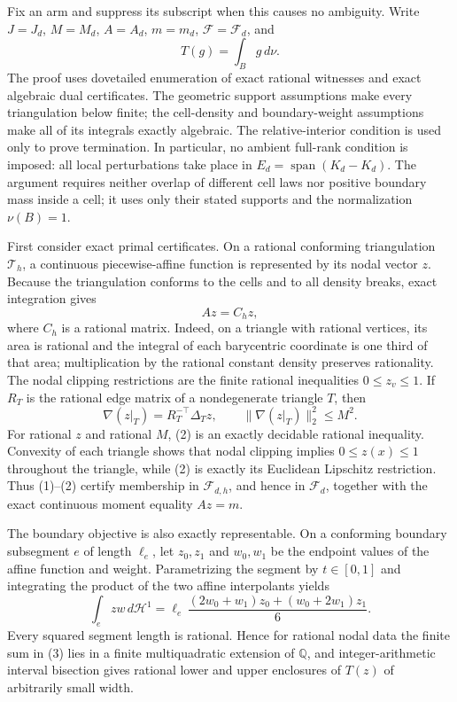 Fix an arm and suppress its subscript when this causes no ambiguity.  Write
\(J=J_d\), \(M=M_d\), \(A=A_d\), \(m=m_d\),
\(\mathcal F=\mathcal F_d\), and
\[
 T(g)=\int_B g\,d\nu.
\]
The proof uses dovetailed enumeration of exact rational witnesses and exact
algebraic dual certificates.  The geometric support assumptions make every
triangulation below finite; the cell-density and boundary-weight assumptions
make all of its integrals exactly algebraic.  The relative-interior condition
is used only to prove termination.  In particular, no ambient full-rank
condition is imposed: all local perturbations take place in
\(E_d=\operatorname{span}(K_d-K_d)\).  The argument requires neither overlap
of different cell laws nor positive boundary mass inside a cell; it uses only
their stated supports and the normalization \(\nu(B)=1\).

First consider exact primal certificates.  On a rational conforming
triangulation \(\mathcal T_h\), a continuous piecewise-affine function is
represented by its nodal vector \(z\).  Because the triangulation conforms to
the cells and to all density breaks, exact integration gives
\[
 Az=C_hz,                                                     \tag{1}
\]
where \(C_h\) is a rational matrix.  Indeed, on a triangle with rational
vertices, its area is rational and the integral of each barycentric coordinate
is one third of that area; multiplication by the rational constant density
preserves rationality.  The nodal clipping restrictions are the finite rational
inequalities \(0\leq z_v\leq1\).  If \(R_T\) is the rational edge matrix of a
nondegenerate triangle \(T\), then
\[
 \nabla(z|_T)=R_T^{-\top}\Delta_Tz,
 \qquad
 \|\nabla(z|_T)\|_2^2\leq M^2.                              \tag{2}
\]
For rational \(z\) and rational \(M\), (2) is an exactly decidable rational
inequality.  Convexity of each triangle shows that nodal clipping implies
\(0\leq z(x)\leq1\) throughout the triangle, while (2) is exactly its
Euclidean Lipschitz restriction.  Thus (1)--(2) certify membership in
\(\mathcal F_{d,h}\), and hence in \(\mathcal F_d\), together with the exact
continuous moment equality \(Az=m\).

The boundary objective is also exactly representable.  On a conforming
boundary subsegment \(e\) of length \(\ell_e\), let \(z_0,z_1\) and
\(w_0,w_1\) be the endpoint values of the affine function and weight.
Parametrizing the segment by \(t\in[0,1]\) and integrating the product of the
two affine interpolants yields
\[
 \int_e zw\,d\mathcal H^1
 =\ell_e\,
   \frac{(2w_0+w_1)z_0+(w_0+2w_1)z_1}{6}.                  \tag{3}
\]
Every squared segment length is rational.  Hence for rational nodal data the
finite sum in (3) lies in a finite multiquadratic extension of \(\mathbb Q\),
and integer-arithmetic interval bisection gives rational lower and upper
enclosures of \(T(z)\) of arbitrarily small width.


